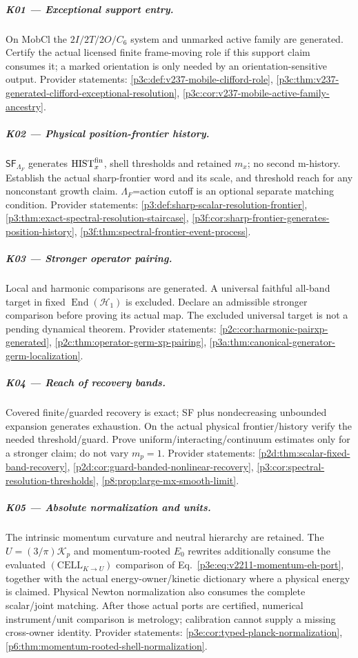 \documentclass[12pt,a4paper]{article}
\begin{document}
\subparagraph{K01 --- Exceptional support entry.}
On MobCl the $2I/2T/2O/C_6$ system and unmarked active family are generated. Certify the actual licensed finite frame-moving role if this support claim consumes it; a marked orientation is only needed by an orientation-sensitive output. Provider statements: \ref{p3c:def:v237-mobile-clifford-role}, \ref{p3c:thm:v237-generated-clifford-exceptional-resolution}, \ref{p3c:cor:v237-mobile-active-family-ancestry}.

\subparagraph{K02 --- Physical position-frontier history.}
$\mathsf{SF}_{\Lambda_F}$ generates $\mathrm{HIST}_x^{\rm fin}$, shell thresholds and retained $m_x$; no second m-history. Establish the actual sharp-frontier word and its scale, and threshold reach for any nonconstant growth claim. $\Lambda_F$=action cutoff is an optional separate matching condition. Provider statements: \ref{p3:def:sharp-scalar-resolution-frontier}, \ref{p3:thm:exact-spectral-resolution-staircase}, \ref{p3f:cor:sharp-frontier-generates-position-history}, \ref{p3f:thm:spectral-frontier-event-process}.

\subparagraph{K03 --- Stronger operator pairing.}
Local and harmonic comparisons are generated. A universal faithful all-band target in fixed $\operatorname{End}(\mathcal H_1)$ is excluded. Declare an admissible stronger comparison before proving its actual map. The excluded universal target is not a pending dynamical theorem. Provider statements: \ref{p2c:cor:harmonic-pairxp-generated}, \ref{p2c:thm:operator-germ-xp-pairing}, \ref{p3a:thm:canonical-generator-germ-localization}.

\subparagraph{K04 --- Reach of recovery bands.}
Covered finite/guarded recovery is exact; SF plus nondecreasing unbounded expansion generates exhaustion. On the actual physical frontier/history verify the needed threshold/guard. Prove uniform/interacting/continuum estimates only for a stronger claim; do not vary $m_p=1$. Provider statements: \ref{p2d:thm:scalar-fixed-band-recovery}, \ref{p2d:cor:guard-banded-nonlinear-recovery}, \ref{p3:cor:spectral-resolution-thresholds}, \ref{p8:prop:large-mx-smooth-limit}.

\subparagraph{K05 --- Absolute normalization and units.}
The intrinsic momentum curvature and neutral hierarchy are retained. The
$U=(3/\pi)\mathcal K_p$ and momentum-rooted $E_0$ rewrites additionally
consume the evaluated $(\mathrm{CELL}_{K\to U})$ comparison of
Eq.~\eqref{p3e:eq:v2211-momentum-eh-port}, together with the actual
energy-owner/kinetic dictionary where a physical energy is claimed. Physical
Newton normalization also consumes the complete scalar/joint matching.
After those actual ports are certified, numerical instrument/unit comparison
is metrology; calibration cannot supply a missing cross-owner identity. Provider statements: \ref{p3e:cor:typed-planck-normalization}, \ref{p6:thm:momentum-rooted-shell-normalization}.
\end{document}

